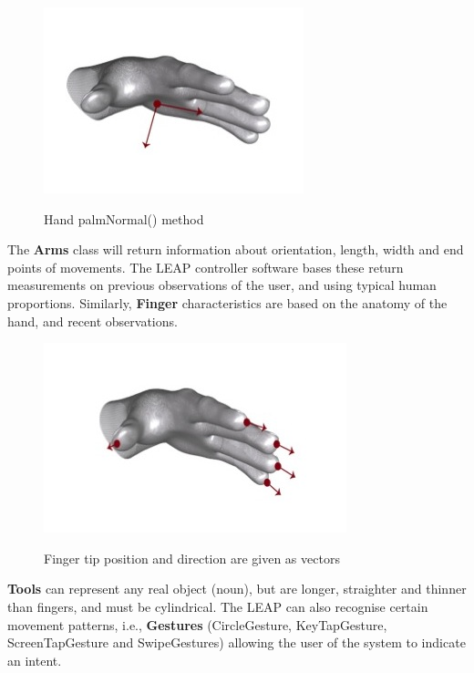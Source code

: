 \documentclass[a4paper, 10pt]{article}
\begin{document}
\begin{figure}[H]
\begin{center}
\includegraphics[scale=0.4]{palm}\\
\caption{Hand palmNormal() method \cite{leap}}
\end{center}
\end{figure}

The \textbf{Arms} class will return information about orientation, length, width and end points of movements. The LEAP controller software bases these return measurements on previous observations of the user, and using typical human proportions. Similarly, \textbf{Finger} characteristics are based on the anatomy of the hand, and recent observations. 

\begin{figure}[H]
\begin{center}
\includegraphics[scale=0.4]{fingers}\\
\caption{Finger tip position and direction are given as vectors \cite{leap}}
\end{center}
\end{figure}

\textbf{Tools} can represent any real object (noun), but are longer, straighter and thinner than fingers, and must be cylindrical. The LEAP can also recognise certain movement patterns, i.e., \textbf{Gestures} (CircleGesture, KeyTapGesture, ScreenTapGesture and SwipeGestures) allowing the user of the system to indicate an intent.
\end{document}

